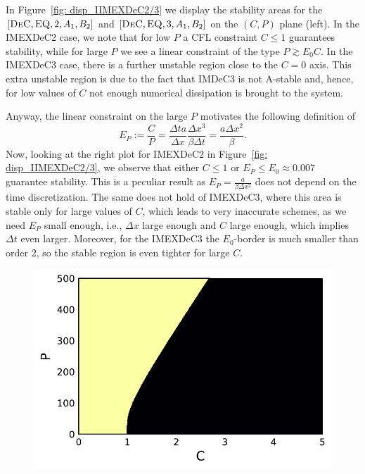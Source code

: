 \begin{example}\label{exa: disp_displaying_stability}
	In Figure~\ref{fig: disp_IIMEXDeC2/3} we display the stability areas for the $[\textsc{DeC}, \textsc{EQ},2,A_1, B_2]$ and $[\textsc{DeC}, \textsc{EQ},3,A_1, B_2]$ on the $(C,P)$ plane (left).
	In the IMEXDeC2 case, we note that for low $P$ a CFL constraint $C\leq 1$ guarantees stability, while for large $P$ we see a linear constraint of the type $P\gtrsim E_0 C $.
	In the IMEXDeC3 case, there is a further unstable region close to the $C=0$ axis. This extra unstable region is due to the fact that IMDeC3 is not A-stable and, hence, for low values of $C$ not enough numerical dissipation is brought to the system.
	
	Anyway, the linear constraint on the large $P$ motivates the following definition of 
	\begin{equation*}
		E_P:=\frac{C}{P}=\frac{\Delta ta}{\Delta x}\frac{\Delta x^3}{\beta\Delta t}=\frac{a \Delta x^2  }{\beta }.
	\end{equation*}
	Now, looking at the right plot for IMEXDeC2 in Figure~\ref{fig: disp_IIMEXDeC2/3}, we observe that either $C\leq 1$ or $E_P\leq E_0 \approx 0.007$ guarantee stability. 
	This is a peculiar result as $E_P=\frac{a  }{\beta \Delta x^2 }$ does not depend on the time discretization.
	The same does not hold of IMEXDeC3, where this area is stable only for large values of $C$, which leads to very inaccurate schemes, as we need $E_P$ small enough, i.e., $\Delta x$ large enough and $C$ large enough, which implies $\Delta t$ even larger.
	Moreover, for the IMEXDeC3 the $E_0$-border is much smaller  than order 2, so the stable region is even tighter for large $C$.
	\begin{figure}
		\centering
		\begin{minipage}[t]{0.32\textwidth}
			\centering
			\includegraphics[width=\textwidth]{pdf/pdepics/disp/contourf_adv_disp_IMEXDeC_gaussLobatto_2_disp_CFD_adv_1_CP.pdf}

\end{minipage}
\end{figure}
\end{example}
